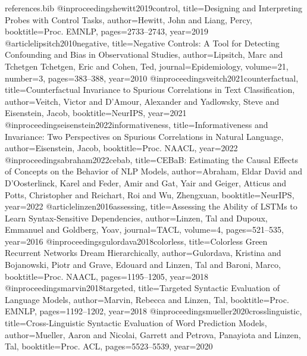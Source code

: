 \begin{filecontents*}[overwrite]{references.bib}
@inproceedings{hewitt2019control, title={Designing and Interpreting Probes with Control Tasks}, author={Hewitt, John and Liang, Percy}, booktitle={Proc. EMNLP}, pages={2733--2743}, year={2019}}
@article{lipsitch2010negative, title={Negative Controls: A Tool for Detecting Confounding and Bias in Observational Studies}, author={Lipsitch, Marc and Tchetgen Tchetgen, Eric and Cohen, Ted}, journal={Epidemiology}, volume={21}, number={3}, pages={383--388}, year={2010}}
@inproceedings{veitch2021counterfactual, title={Counterfactual Invariance to Spurious Correlations in Text Classification}, author={Veitch, Victor and D'Amour, Alexander and Yadlowsky, Steve and Eisenstein, Jacob}, booktitle={NeurIPS}, year={2021}}
@inproceedings{eisenstein2022informativeness, title={Informativeness and Invariance: Two Perspectives on Spurious Correlations in Natural Language}, author={Eisenstein, Jacob}, booktitle={Proc. NAACL}, year={2022}}
@inproceedings{abraham2022cebab, title={{CEBaB}: Estimating the Causal Effects of Concepts on the Behavior of {NLP} Models}, author={Abraham, Eldar David and D'Oosterlinck, Karel and Feder, Amir and Gat, Yair and Geiger, Atticus and Potts, Christopher and Reichart, Roi and Wu, Zhengxuan}, booktitle={NeurIPS}, year={2022}}
@article{linzen2016assessing, title={Assessing the Ability of {LSTM}s to Learn Syntax-Sensitive Dependencies}, author={Linzen, Tal and Dupoux, Emmanuel and Goldberg, Yoav}, journal={TACL}, volume={4}, pages={521--535}, year={2016}}
@inproceedings{gulordava2018colorless, title={Colorless Green Recurrent Networks Dream Hierarchically}, author={Gulordava, Kristina and Bojanowski, Piotr and Grave, Edouard and Linzen, Tal and Baroni, Marco}, booktitle={Proc. NAACL}, pages={1195--1205}, year={2018}}
@inproceedings{marvin2018targeted, title={Targeted Syntactic Evaluation of Language Models}, author={Marvin, Rebecca and Linzen, Tal}, booktitle={Proc. EMNLP}, pages={1192--1202}, year={2018}}
@inproceedings{mueller2020crosslinguistic, title={Cross-Linguistic Syntactic Evaluation of Word Prediction Models}, author={Mueller, Aaron and Nicolai, Garrett and Petrova, Panayiota and Linzen, Tal}, booktitle={Proc. ACL}, pages={5523--5539}, year={2020}}
\end{filecontents*}

\documentclass[11pt,twocolumn]{article}
\usepackage[letterpaper,top=1in,bottom=1in,left=0.9in,right=0.9in]{geometry}
\setlength{\columnsep}{0.28in}
\usepackage{times}
\usepackage[T1]{fontenc}
\usepackage[utf8]{inputenc}
\usepackage{amssymb,amsmath}
\usepackage{booktabs}
\usepackage{graphicx}
\graphicspath{{figures/}{./}}
\usepackage[round]{natbib}
\usepackage{microtype}

